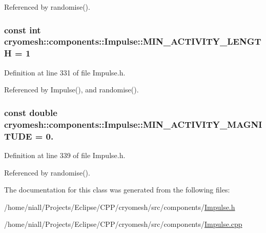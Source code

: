 \-Referenced by randomise().

\hypertarget{classcryomesh_1_1components_1_1Impulse_ac24594fb7419a2f3e9f4d753dfae562f}{
\subsubsection[{\-M\-I\-N\-\_\-\-A\-C\-T\-I\-V\-I\-T\-Y\-\_\-\-L\-E\-N\-G\-T\-H}]{\setlength{\rightskip}{0pt plus 5cm}const int {\bf cryomesh\-::components\-::\-Impulse\-::\-M\-I\-N\-\_\-\-A\-C\-T\-I\-V\-I\-T\-Y\-\_\-\-L\-E\-N\-G\-T\-H} = 1}}\label{classcryomesh_1_1components_1_1Impulse_ac24594fb7419a2f3e9f4d753dfae562f}


\-Definition at line 331 of file \-Impulse.\-h.



\-Referenced by \-Impulse(), and randomise().

\hypertarget{classcryomesh_1_1components_1_1Impulse_a831758cc2e20d4a2d10b71f8c7698fd1}{
\subsubsection[{\-M\-I\-N\-\_\-\-A\-C\-T\-I\-V\-I\-T\-Y\-\_\-\-M\-A\-G\-N\-I\-T\-U\-D\-E}]{\setlength{\rightskip}{0pt plus 5cm}const double {\bf cryomesh\-::components\-::\-Impulse\-::\-M\-I\-N\-\_\-\-A\-C\-T\-I\-V\-I\-T\-Y\-\_\-\-M\-A\-G\-N\-I\-T\-U\-D\-E} = 0.}}\label{classcryomesh_1_1components_1_1Impulse_a831758cc2e20d4a2d10b71f8c7698fd1}


\-Definition at line 339 of file \-Impulse.\-h.



\-Referenced by randomise().



\-The documentation for this class was generated from the following files\-:\begin{DoxyCompactItemize}
\item 
/home/niall/\-Projects/\-Eclipse/\-C\-P\-P/cryomesh/src/components/\hyperlink{Impulse_8h}{\-Impulse.\-h}\item 
/home/niall/\-Projects/\-Eclipse/\-C\-P\-P/cryomesh/src/components/\hyperlink{Impulse_8cpp}{\-Impulse.\-cpp}\end{DoxyCompactItemize}
